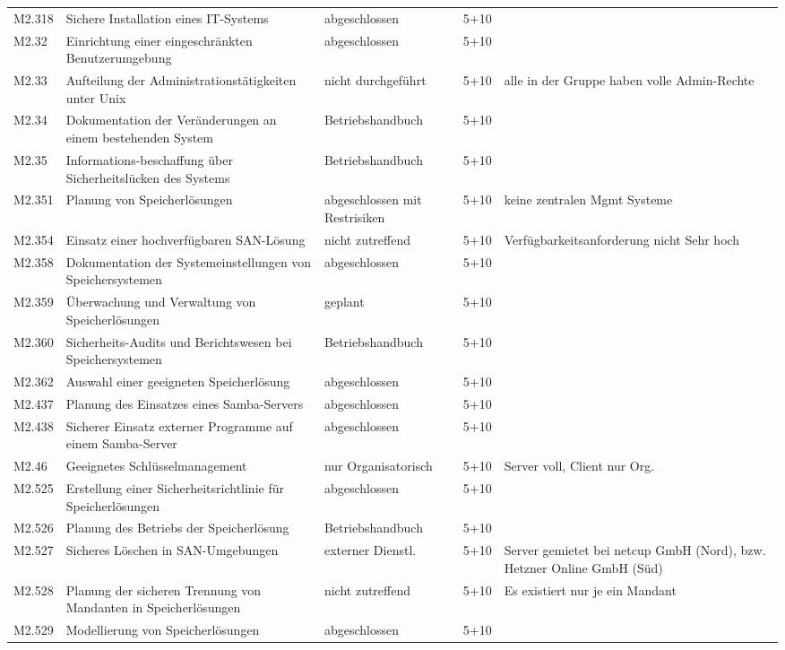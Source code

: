 \begin{longtable}{lp{3.7cm}p{3cm}lp{3.8cm}}
M2.318 & Sichere Installation eines IT-Systems & abgeschlossen & 5+10 &  \\
M2.32 & Einrichtung einer eingeschränkten Benutzerumgebung & abgeschlossen & 5+10 &  \\
M2.33 & Aufteilung der Administrationstätigkeiten unter Unix & nicht durchgeführt & 5+10 & alle in der Gruppe haben volle Admin-Rechte \\
M2.34 & Dokumentation der Veränderungen an einem bestehenden System & Betriebshandbuch & 5+10 &  \\
M2.35 & Informations-beschaffung über Sicherheitslücken des Systems & Betriebshandbuch & 5+10 &  \\
M2.351 & Planung von Speicherlösungen & abgeschlossen mit Restrisiken & 5+10 & keine zentralen Mgmt Systeme \\
M2.354 & Einsatz einer hochverfügbaren SAN-Lösung & nicht zutreffend & 5+10 & Verfügbarkeitsanforderung nicht Sehr hoch \\
M2.358 & Dokumentation der Systemeinstellungen von Speichersystemen & abgeschlossen & 5+10 &  \\
M2.359 & Überwachung und Verwaltung von Speicherlösungen & geplant & 5+10 &  \\
M2.360 & Sicherheits-Audits und Berichtswesen bei Speichersystemen & Betriebshandbuch & 5+10 &  \\
M2.362 & Auswahl einer geeigneten Speicherlösung & abgeschlossen & 5+10 &  \\
M2.437 & Planung des Einsatzes eines Samba-Servers & abgeschlossen & 5+10 &  \\
M2.438 & Sicherer Einsatz externer Programme auf einem Samba-Server & abgeschlossen & 5+10 &  \\
M2.46 & Geeignetes Schlüsselmanagement & nur Organisatorisch & 5+10 & Server voll, Client nur Org. \\
M2.525 & Erstellung einer Sicherheitsrichtlinie für Speicherlösungen & abgeschlossen & 5+10 &  \\
M2.526 & Planung des Betriebs der Speicherlösung & Betriebshandbuch & 5+10 &  \\
M2.527 & Sicheres Löschen in SAN-Umgebungen & externer Dienstl. & 5+10 & Server gemietet bei netcup GmbH (Nord), bzw. Hetzner Online GmbH (Süd) \\
M2.528 & Planung der sicheren Trennung von Mandanten in Speicherlösungen & nicht zutreffend & 5+10 & Es existiert nur je ein Mandant \\
M2.529 & Modellierung von Speicherlösungen & abgeschlossen & 5+10 &  \\

\end{longtable}
